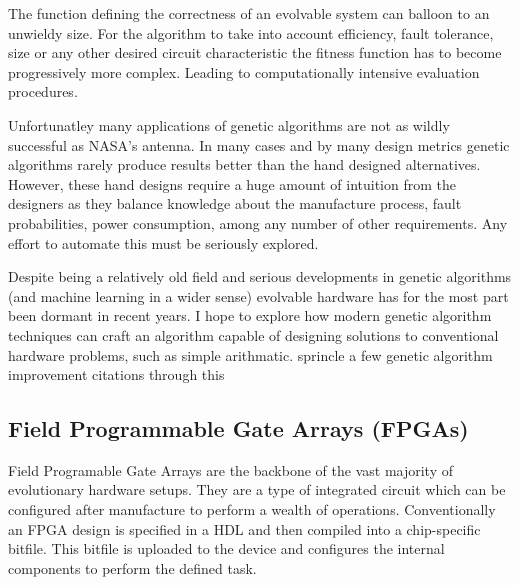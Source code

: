 The function defining the correctness of an evolvable system can balloon
to an unwieldy size. For the algorithm to take into account efficiency, fault tolerance, size
or any other desired circuit characteristic the fitness function has to
become progressively more complex. Leading to computationally intensive
evaluation procedures.

Unfortunatley many applications of genetic algorithms are not as wildly
successful as NASA's antenna.
In many cases and by many design metrics genetic algorithms rarely produce results
better than the hand designed alternatives. However, these hand designs require
a huge amount of intuition from the designers as they balance
knowledge about the manufacture process, fault probabilities, power
consumption, among any number of other requirements. Any effort to automate
this must be seriously explored.

Despite being a relatively old field and serious developments in genetic
algorithms (and machine learning in a wider sense) evolvable hardware has for
the most part been dormant in recent years. I hope to explore how modern
genetic algorithm techniques can craft an algorithm capable of designing solutions
to conventional hardware problems, such as simple arithmatic.
\todo sprincle a few genetic algorithm improvement citations through this

\subsection{Field Programmable Gate Arrays (FPGAs)}
Field Programable Gate Arrays are the backbone of the vast majority of evolutionary
hardware setups. They are a type of integrated circuit which can be
configured after manufacture to perform a wealth of operations. Conventionally
an FPGA design is specified in a HDL and then compiled into a chip-specific bitfile.
This bitfile is uploaded to the device and configures the internal components
to perform the defined task.

